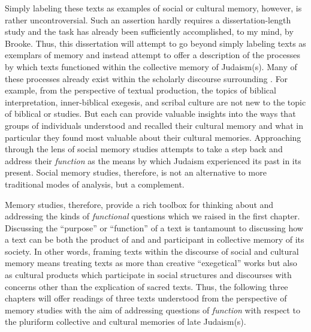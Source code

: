 Simply labeling these \rwb texts as examples of social or cultural memory, however, is rather uncontroversial. Such an assertion hardly requires a dissertation-length study and the task has already been sufficiently accomplished, to my mind, by Brooke.\autocite{brooke_zsengeller2014} Thus, this dissertation will attempt to go beyond simply labeling \rwb texts as exemplars of memory and instead attempt to offer a description of the processes by which \rwb texts functioned within the collective memory of \secondtemple Judaism(s). Many of these processes already exist within the scholarly discourse surrounding \rwb. For example, from the perspective of textual production, the topics of biblical interpretation, inner-biblical exegesis, and scribal culture are not new to the topic of biblical or \qumran studies. But each can provide valuable insights into the ways that groups of individuals understood and recalled their cultural memory and what in particular they found most valuable about their cultural memories. Approaching \rwb through the lens of social memory studies attempts to take a step back and address their \emph{function} as the means by which \secondtemple Judaism experienced its past in its present. Social memory studies, therefore, is not an alternative to more traditional modes of analysis, but a complement. 

Memory studies, therefore, provide a rich toolbox for thinking about and addressing the kinds of \emph{functional} questions which we raised in the first chapter. Discussing the ``purpose'' or ``function'' of a text is tantamount to discussing how a text can be both the product of and and participant in collective memory of its society. In other words, framing \rwb texts within the discourse of social and cultural memory means treating \rwb texts as more than creative ``exegetical'' works but also as cultural products which participate in social structures and discourses with concerns other than the explication of sacred texts. Thus, the following three chapters will offer readings of three \rwb texts understood from the perspective of memory studies with the aim of addressing questions of \emph{function} with respect to the pluriform collective and cultural memories of late \secondtemple Judaism(s).